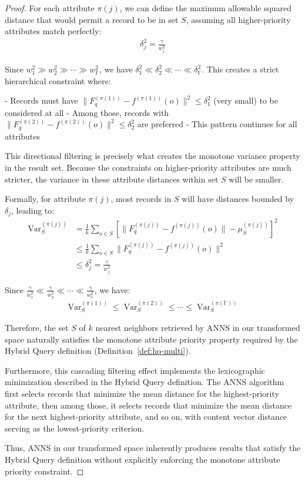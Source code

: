 \documentclass[numbers,sort]{article}
\begin{document}
\begin{proof}
For each attribute $\pi(j)$, we can define the maximum allowable squared distance that would permit a record to be in set $S$, assuming all higher-priority attributes match perfectly:
\begin{align}
\delta_j^2 = \frac{\gamma}{w_j^2}
\end{align}

Since $w_1^2 \gg w_2^2 \gg \cdots \gg w_{\mathbb{F}}^2$, we have $\delta_1^2 \ll \delta_2^2 \ll \cdots \ll \delta_{\mathbb{F}}^2$. This creates a strict hierarchical constraint where:

- Records must have $\|F^{(\pi(1))}_q - f^{(\pi(1))}(o)\|^2 \leq \delta_1^2$ (very small) to be considered at all
- Among those, records with $\|F^{(\pi(2))}_q - f^{(\pi(2))}(o)\|^2 \leq \delta_2^2$ are preferred
- This pattern continues for all attributes

This directional filtering is precisely what creates the monotone variance property in the result set. Because the constraints on higher-priority attributes are much stricter, the variance in these attribute distances within set $S$ will be smaller.

Formally, for attribute $\pi(j)$, most records in $S$ will have distances bounded by $\delta_j$, leading to:
\begin{align}
\operatorname{Var}_S^{(\pi(j))} &= \frac{1}{k} \sum_{o \in S} \left[ \|F^{(\pi(j))}_q - f^{(\pi(j))}(o)\| - \mu_S^{(\pi(j))} \right]^2 \\
&\leq \frac{1}{k} \sum_{o \in S} \|F^{(\pi(j))}_q - f^{(\pi(j))}(o)\|^2 \\
&\leq \delta_j^2 = \frac{\gamma}{w_j^2}
\end{align}

Since $\frac{\gamma}{w_1^2} \ll \frac{\gamma}{w_2^2} \ll \cdots \ll \frac{\gamma}{w_{\mathbb{F}}^2}$, we have:
\begin{align}
\operatorname{Var}_S^{(\pi(1))} \leq \operatorname{Var}_S^{(\pi(2))} \leq \cdots \leq \operatorname{Var}_S^{(\pi(\mathbb{F}))}
\end{align}

Therefore, the set $S$ of $k$ nearest neighbors retrieved by ANNS in our transformed space naturally satisfies the monotone attribute priority property required by the Hybrid Query definition (Definition~\ref*{def:hq-multi}).

Furthermore, this cascading filtering effect implements the lexicographic minimization described in the Hybrid Query definition. The ANNS algorithm first selects records that minimize the mean distance for the highest-priority attribute, then among those, it selects records that minimize the mean distance for the next highest-priority attribute, and so on, with content vector distance serving as the lowest-priority criterion.

Thus, ANNS in our transformed space inherently produces results that satisfy the Hybrid Query definition without explicitly enforcing the monotone attribute priority constraint.
\end{proof}
\end{document}
